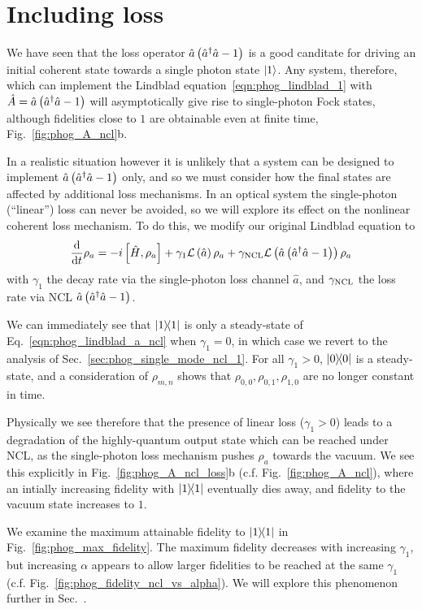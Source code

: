 \clearpage
\section{Including loss}\label{sec:phog_including_loss}
We have seen that the loss operator $\hat{a}\left(\hat{a}^\dagger \hat{a} - 1\right)$ is a good canditate for driving an initial coherent state towards a single photon state $\ket{1}$. Any system, therefore, which can implement the Lindblad equation~\ref{eqn:phog_lindblad_1} with $\hat{A} = \hat{a}\left(\hat{a}^\dagger \hat{a} - 1\right)$ will asymptotically give rise to single-photon Fock states, although fidelities close to $1$ are obtainable even at finite time, Fig.~\ref{fig:phog_A_ncl}b. 

In a realistic situation however it is unlikely that a system can be designed to implement $\hat{a}\left(\hat{a}^\dagger \hat{a} - 1\right)$ only, and so we must consider how the final states are affected by additional loss mechanisms. In an optical system the single-photon (``linear'') loss can never be avoided, so we will explore its effect on the nonlinear coherent loss mechanism.  To do this, we modify our original Lindblad equation to
\begin{equation}\label{eqn:phog_lindblad_a_ncl}
\frac{\mathrm{d}}{\mathrm{d}t} \rho_a =  - i \left[ \hat{H}, \rho_a\right] + \gamma_1 \mathcal{L}\left(\hat{a}\right)\rho_a + \gamma_{\text{NCL}} \mathcal{L}\left(\hat{a}\left(\hat{a}^\dagger \hat{a} - 1\right)\right)\rho_a
\end{equation}
with $\gamma_1$ the decay rate via the single-photon loss channel $\hat{a}$, and $\gamma_{\text{NCL}}$ the loss rate via NCL $\hat{a}\left(\hat{a}^\dagger \hat{a} - 1\right)$.

We can immediately see that $\dyad{1}$ is only a steady-state of Eq.~\ref{eqn:phog_lindblad_a_ncl} when $\gamma_1 = 0$, in which case we revert to the analysis of Sec.~\ref{sec:phog_single_mode_ncl_1}. For all $\gamma_1 > 0$, $\dyad{0}$ is a steady-state, and a consideration of $\rho_{m, n}$ shows that $\rho_{0, 0}, \rho_{0, 1}, \rho_{1, 0}$ are no longer constant in time. 

Physically we see therefore that the presence of linear loss ($\gamma_1 > 0$) leads to a degradation of the highly-quantum output state which can be reached under NCL, as the single-photon loss mechanism pushes $\rho_a$ towards the vacuum. We see this explicitly in Fig.~\ref{fig:phog_A_ncl_loss}b (c.f. Fig.~\ref{fig:phog_A_ncl}), where an intially increasing fidelity with $\dyad{1}$ eventually dies away, and fidelity to the vacuum state increases to $1$. 

We examine the maximum attainable fidelity to $\dyad{1}$ in Fig.~\ref{fig:phog_max_fidelity}. The maximum fidelity decreases with increasing $\gamma_1$, but increasing $\alpha$ appears to allow larger fidelities to be reached at the same $\gamma_1$ (c.f. Fig.~\ref{fig:phog_fidelity_ncl_vs_alpha}). We will explore this phenomenon further in Sec.~.




